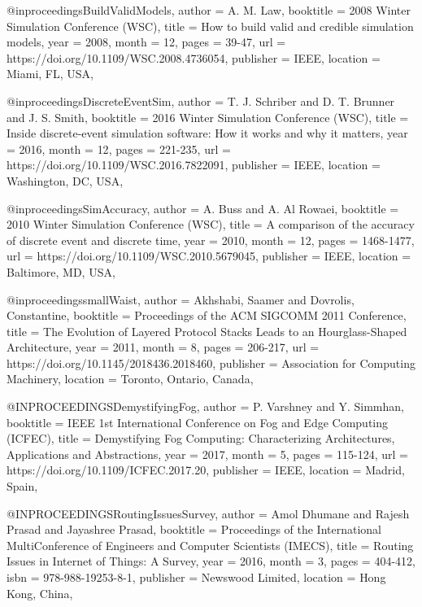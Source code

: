 \documentclass[english,version-2019-11]{uzl-thesis}
\begin{document}
\begin{bibtex-entries}
@inproceedings{BuildValidModels,
    author      = {A. M. {Law}},
    booktitle   = {2008 Winter Simulation Conference (WSC)},
    title       = {How to build valid and credible simulation models},
    year        = {2008},
    month       = {12},
    pages       = {39-47},
    url         = {https://doi.org/10.1109/WSC.2008.4736054},
    publisher   = {IEEE},
    location    = {Miami, FL, USA},
}

@inproceedings{DiscreteEventSim,
    author      = {T. J. {Schriber} and D. T. {Brunner} and J. S. {Smith}},
    booktitle   = {2016 Winter Simulation Conference (WSC)},
    title       = {Inside discrete-event simulation software: How it works and why it matters},
    year        = {2016},
    month       = {12},
    pages       = {221-235},
    url         = {https://doi.org/10.1109/WSC.2016.7822091},
    publisher   = {IEEE},
    location    = {Washington, DC, USA},
}

@inproceedings{SimAccuracy,
    author      = {A. {Buss} and A. {Al Rowaei}},
    booktitle   = {2010 Winter Simulation Conference (WSC)},
    title       = {A comparison of the accuracy of discrete event and discrete time},
    year        = {2010},
    month       = {12},
    pages       = {1468-1477},
    url         = {https://doi.org/10.1109/WSC.2010.5679045},
    publisher   = {IEEE},
    location    = {Baltimore, MD, USA},
}

@inproceedings{smallWaist,
    author      = {Akhshabi, Saamer and Dovrolis, Constantine},
    booktitle   = {Proceedings of the ACM SIGCOMM 2011 Conference},
    title       = {The Evolution of Layered Protocol Stacks Leads to an Hourglass-Shaped Architecture},
    year        = {2011},
    month       = {8},
    pages       = {206-217},
    url         = {https://doi.org/10.1145/2018436.2018460},
    publisher   = {Association for Computing Machinery},    
    location    = {Toronto, Ontario, Canada},
}

@INPROCEEDINGS{DemystifyingFog,
  author        = {P. {Varshney} and Y. {Simmhan}},
  booktitle     = {IEEE 1st International Conference on Fog and Edge Computing (ICFEC)}, 
  title         = {Demystifying Fog Computing: Characterizing Architectures, Applications and Abstractions}, 
  year          = {2017},
  month         = {5},
  pages         = {115-124},
  url           = {https://doi.org/10.1109/ICFEC.2017.20},
  publisher     = {IEEE},
  location      = {Madrid, Spain},
}

@INPROCEEDINGS{RoutingIssuesSurvey,
  author        = {Amol Dhumane and Rajesh Prasad and Jayashree Prasad},
  booktitle     = {Proceedings of the International MultiConference of Engineers and Computer Scientists (IMECS)}, 
  title         = {Routing Issues in Internet of Things: A Survey}, 
  year          = {2016},
  month         = {3},
  pages         = {404-412},
  isbn          = {978-988-19253-8-1},
  publisher     = {Newswood Limited},
  location      = {Hong Kong, China},
}



\end{bibtex-entries}
\end{document}
